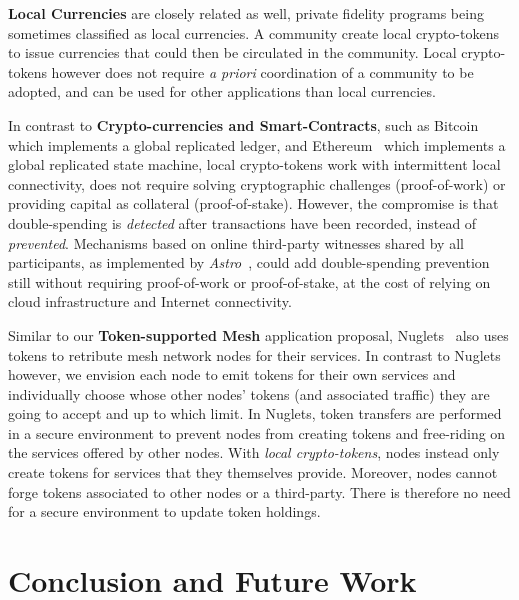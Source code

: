 \documentclass[sigplan,screen,10pt,review,anonymous]{acmart}
\begin{document}
\textbf{Local Currencies} are closely related as well, private fidelity programs being sometimes classified as local currencies. A community create local crypto-tokens to issue currencies that could then be circulated in the community. Local crypto-tokens however does not require \textit{a priori} coordination of a community to be adopted, and can be used for other applications than local currencies.

In contrast to \textbf{Crypto-currencies and Smart-Contracts}, such as Bitcoin~\cite{nakamoto2008bitcoin} which implements a global replicated ledger, and Ethereum~\cite{buterin2014next} which implements a global replicated state machine, local crypto-tokens work with intermittent local connectivity, does not require solving cryptographic challenges (proof-of-work) or providing capital as collateral (proof-of-stake). However, the compromise is that double-spending is \textit{detected} after transactions have been recorded, instead of \textit{prevented}. Mechanisms based on online third-party witnesses shared by all participants, as implemented by \textit{Astro}~\cite{collins2020online}, could add double-spending prevention still without requiring proof-of-work or proof-of-stake, at the cost of relying on cloud infrastructure and Internet connectivity.

Similar to our \textbf{Token-supported Mesh} application proposal, Nuglets~\cite{buttyan2001nuglets} also uses tokens to retribute mesh network nodes for their services. In contrast to Nuglets however, we envision each node to emit tokens for their own services and individually choose whose other nodes' tokens (and associated traffic) they are going to accept and up to which limit. In Nuglets, token transfers are performed in a secure environment to prevent nodes from creating tokens and free-riding on the services offered by other nodes. With \textit{local crypto-tokens}, nodes instead only create tokens for services that they themselves provide. Moreover, nodes cannot forge tokens associated to other nodes or a third-party. There is therefore no need for a secure environment to update token holdings. 

\section{Conclusion and Future Work}
\label{section:conclusion}
\end{document}
